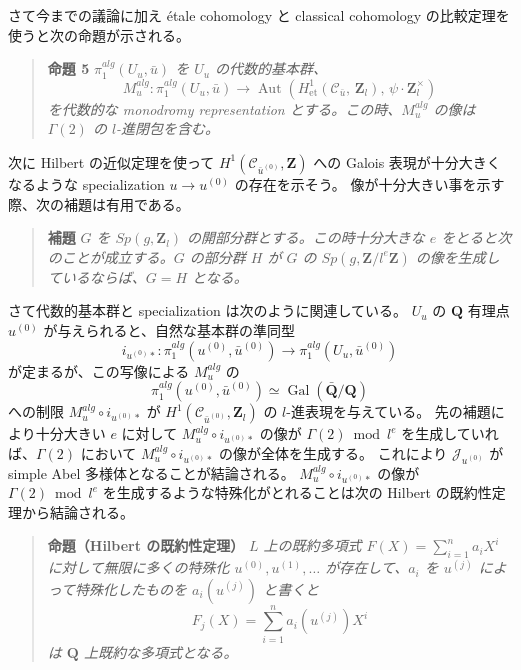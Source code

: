\documentclass[uplatex,dvipdfmx]{jlreq}
\def\Aut{\operatorname{Aut}}
\def\Gal{\operatorname{Gal}}
\begin{document}
さて今までの議論に加え étale cohomology と classical cohomology の比較定理を使うと次の命題が示される。

\begin{quote}
\textbf{命題 5}\quad
\textit{$\pi_1^{alg}(U_u, \bar{u})$ を $U_u$ の代数的基本群、
\[
  M_{u}^{alg} : \pi_1^{alg}(U_u, \bar{u}) \to \Aut(H^1_{\mathrm{et}}(\mathcal{C}_{\bar{u}},\, \mathbf{Z}_l),\, \psi \cdot \mathbf{Z}_l^{\times})
\]
を代数的な monodromy representation とする。この時、$M_u^{alg}$ の像は $\Gamma(2)$ の $l$-進閉包を含む。}
\end{quote}

次に Hilbert の近似定理を使って $H^1(\mathcal{C}_{\bar{u}^{(0)}}, \mathbf{Z})$ への Galois 表現が十分大きくなるような specialization $u \to u^{(0)}$ の存在を示そう。
像が十分大きい事を示す際、次の補題は有用である。

\begin{quote}
\textbf{補題}\quad
\textit{$G$ を $Sp(g, \mathbf{Z}_l)$ の開部分群とする。この時十分大きな $e$ をとると次のことが成立する。$G$ の部分群 $H$ が $G$ の $Sp(g, \mathbf{Z}/l^e\mathbf{Z})$ の像を生成しているならば、$G = H$ となる。}
\end{quote}

さて代数的基本群と specialization は次のように関連している。
$U_u$ の $\mathbf{Q}$ 有理点 $u^{(0)}$ が与えられると、自然な基本群の準同型
\[
  i_{u^{(0)}*} : \pi_1^{alg}(u^{(0)}, \bar{u}^{(0)}) \to \pi_1^{alg}(U_u, \bar{u}^{(0)})
\]
が定まるが、この写像による $M_u^{alg}$ の
\[
  \pi_1^{alg}(u^{(0)}, \bar{u}^{(0)}) \simeq \Gal(\bar{\mathbf{Q}} / \mathbf{Q})
\]
への制限 $M_u^{alg} \circ i_{u^{(0)}*}$ が $H^1(\mathcal{C}_{\bar{u}^{(0)}}, \mathbf{Z}_l)$ の $l$-進表現を与えている。
先の補題により十分大きい $e$ に対して $M_u^{alg} \circ i_{u^{(0)}*}$ の像が $\Gamma(2) \bmod l^e$ を生成していれば、$\Gamma(2)$ において $M_u^{alg} \circ i_{u^{(0)}*}$ の像が全体を生成する。
これにより $\mathcal{J}_{u^{(0)}}$ が simple Abel 多様体となることが結論される。
$M_u^{alg} \circ i_{u^{(0)}*}$ の像が $\Gamma(2) \bmod l^e$ を生成するような特殊化がとれることは次の Hilbert の既約性定理から結論される。

\begin{quote}
\textbf{命題（Hilbert の既約性定理）}\quad
\textit{$L$ 上の既約多項式 $F(X) = \sum_{i=1}^n a_i X^i$ に対して無限に多くの特殊化 $u^{(0)}, u^{(1)}, \dots$ が存在して、$a_i$ を $u^{(j)}$ によって特殊化したものを $a_i(u^{(j)})$ と書くと
\[
  F_j(X) = \sum_{i=1}^n a_i(u^{(j)}) X^i
\]
は $\mathbf{Q}$ 上既約な多項式となる。}
\end{quote}
\end{document}
